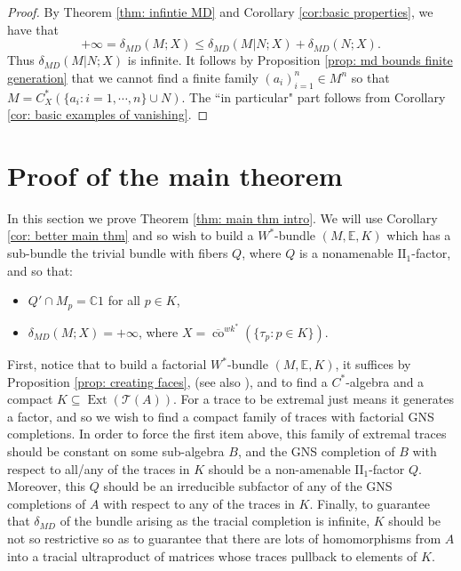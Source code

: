 \documentclass[10pt]{amsart}
\theoremstyle{definition}
\numberwithin{equation}{section}
\newcommand{\bC}{{\mathbb C}}
\newcommand{\bE}{{\mathbb E}}
\newcommand{\cT}{{\mathcal T}}
\DeclareMathOperator{\Ext}{Ext}
\DeclareMathOperator{\co}{co}
\begin{document}
\begin{proof}
By Theorem \ref{thm: infintie MD} and Corollary \ref{cor:basic properties}, we have that 
\[+\infty=\delta_{MD}(M;X)\leq \delta_{MD}(M|N;X)+\delta_{MD}(N;X).\]
Thus $\delta_{MD}(M|N;X)$ is infinite.
It follows by Proposition \ref{prop: md bounds finite generation} that we cannot find a finite family $(a_{i})_{i=1}^{n}\in M^{n}$ so that $M=C^{*}_{X}(\{a_{i}:i=1,\cdots,n\}\cup N)$. 
The ``in particular" part follows from Corollary \ref{cor: basic examples of vanishing}.
\end{proof}


\section{Proof of the main theorem}

In this section we prove Theorem \ref{thm: main thm intro}. We will use Corollary \ref{cor: better main thm} and so wish to build a $W^{*}$-bundle $(M,\bE,K)$ which has a sub-bundle the trivial bundle with fibers $Q$, where $Q$ is a nonamenable $\textrm{II}_{1}$-factor, and so that:
\begin{itemize}
    \item $Q'\cap M_{p}=\bC 1$ for all $p\in K$,
    \item $\delta_{MD}(M;X)=+\infty$, where $X=\overline{\co}^{wk^{*}}(\{\tau_{p}:p\in K\})$. 
\end{itemize}
First, notice that to build a factorial $W^{*}$-bundle $(M,\bE,K)$, it suffices by Proposition \ref{prop: creating faces}, \cite[Theorem 3]{OzawaBundle} (see also \cite[Theorem 3.37]{TraciallyComplete}), and \cite[Proposition 3.23 (ii) and (iv)]{TraciallyComplete} to find a $C^{*}$-algebra and a compact $K\subseteq \Ext(\cT(A))$. For a trace to be extremal just means it generates a factor, and so we wish to find a compact family of traces with factorial GNS completions. In order to force the first item above, this family of extremal traces should be constant on some sub-algebra $B$, and the GNS completion of $B$ with respect to all/any of the traces in $K$ should be a non-amenable $\textrm{II}_{1}$-factor $Q$. Moreover, this $Q$ should be an irreducible subfactor of any of the GNS completions of $A$ with respect to any of the traces in $K$. Finally, to guarantee that $\delta_{MD}$ of the bundle arising as the tracial completion is infinite, $K$ should be not so restrictive so as to guarantee that there are lots of homomorphisms from $A$ into a tracial ultraproduct of matrices whose traces pullback to elements of $K$. 
\end{document}

